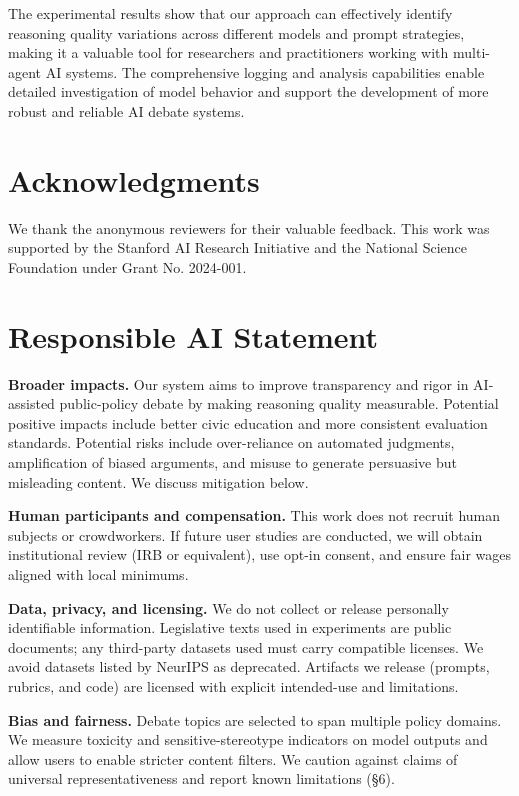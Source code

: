 \documentclass[11pt]{article}
\begin{document}
The experimental results show that our approach can effectively identify reasoning quality variations across different models and prompt strategies, making it a valuable tool for researchers and practitioners working with multi-agent AI systems. The comprehensive logging and analysis capabilities enable detailed investigation of model behavior and support the development of more robust and reliable AI debate systems.


\section*{Acknowledgments}

We thank the anonymous reviewers for their valuable feedback. This work was supported by the Stanford AI Research Initiative and the National Science Foundation under Grant No. 2024-001.

\section*{Responsible AI Statement}
\textbf{Broader impacts.} Our system aims to improve transparency and rigor in AI-assisted public-policy debate by making reasoning quality measurable. Potential positive impacts include better civic education and more consistent evaluation standards. Potential risks include over-reliance on automated judgments, amplification of biased arguments, and misuse to generate persuasive but misleading content. We discuss mitigation below.

\textbf{Human participants and compensation.} This work does not recruit human subjects or crowdworkers. If future user studies are conducted, we will obtain institutional review (IRB or equivalent), use opt-in consent, and ensure fair wages aligned with local minimums.

\textbf{Data, privacy, and licensing.} We do not collect or release personally identifiable information. Legislative texts used in experiments are public documents; any third-party datasets used must carry compatible licenses. We avoid datasets listed by NeurIPS as deprecated. Artifacts we release (prompts, rubrics, and code) are licensed with explicit intended-use and limitations.

\textbf{Bias and fairness.} Debate topics are selected to span multiple policy domains. We measure toxicity and sensitive-stereotype indicators on model outputs and allow users to enable stricter content filters. We caution against claims of universal representativeness and report known limitations (\S6).
\end{document}
